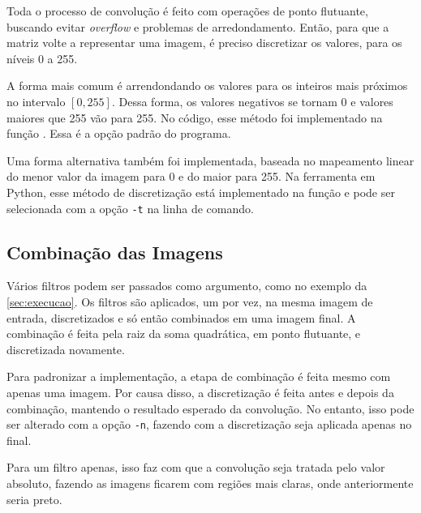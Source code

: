     Toda o processo de convolução é feito com operações de ponto flutuante, buscando evitar \textit{overflow} e problemas de arredondamento. Então, para que a matriz volte a representar uma imagem, é preciso discretizar os valores, para os níveis 0 a 255.

    A forma mais comum é arrendondando os valores para os inteiros mais próximos no intervalo $[0, 255]$. Dessa forma, os valores negativos se tornam 0 e valores maiores que 255 vão para 255. No código, esse método foi implementado na função . Essa é a opção padrão do programa.

    Uma forma alternativa também foi implementada, baseada no mapeamento linear do menor valor da imagem para 0 e do maior para 255. Na ferramenta em Python, esse método de discretização está implementado na função  e pode ser selecionada com a opção \texttt{-t} na linha de comando.

\subsection{Combinação das Imagens}

    Vários filtros podem ser passados como argumento, como no exemplo da \cref{sec:execucao}. Os filtros são aplicados, um por vez, na mesma imagem de entrada, discretizados e só então combinados em uma imagem final. A combinação é feita pela raiz da soma quadrática, em ponto flutuante, e discretizada novamente.

    Para padronizar a implementação, a etapa de combinação é feita mesmo com apenas uma imagem. Por causa disso, a discretização é feita antes e depois da combinação, mantendo o resultado esperado da convolução. No entanto, isso pode ser alterado com a opção \texttt{-n}, fazendo com a discretização seja aplicada apenas no final.

    Para um filtro apenas, isso faz com que a convolução seja tratada pelo valor absoluto, fazendo as imagens ficarem com regiões mais claras, onde anteriormente seria preto.
